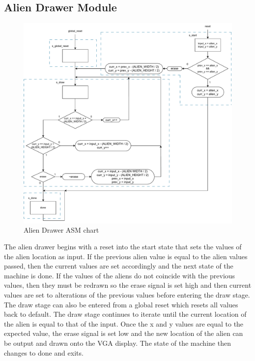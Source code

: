 \documentclass[11pt, titlepage]{article}
\begin{document}
        \subsection{Alien Drawer Module}
            \begin{figure}[H]
                \centering
                \includegraphics[scale = 0.57]{Images/Alien Drawer.pdf}
                \caption{Alien Drawer ASM chart}
            \end{figure}
            The alien drawer begins with a reset into the start state that sets the values of the alien location as input. If the previous alien value is equal to the alien values passed, then the current values are set accordingly and the next state of the machine is done. If the values of the aliens do not coincide with the previous values, then they must be redrawn so the erase signal is set high and then current values are set to alterations of the previous values before entering the draw stage. The draw stage can also be entered from a global reset which resets all values back to default. The draw stage continues to iterate until the current location of the alien is equal to that of the input. Once the x and y values are equal to the expected value, the erase signal is set low and the new location of the alien can be output and drawn onto the VGA display. The state of the machine then changes to done and exits.
\end{document}
